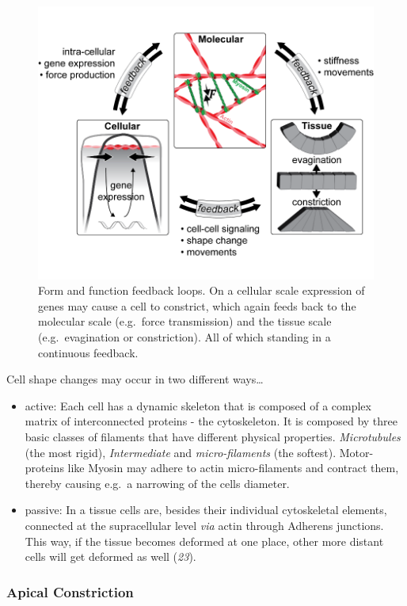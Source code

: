 \documentclass[11pt,singlespacinge,twoside]{reedthesis} %
\providecommand{\tightlist}{%
  \setlength{\itemsep}{0pt}\setlength{\parskip}{0pt}}
\theoremstyle{definition}
\theoremstyle{definition}
\theoremstyle{definition}
\theoremstyle{remark}
\begin{document}
\begin{figure}[h]

{\centering \includegraphics[width=0.85\linewidth,]{figures/intro/feedback} 

}

\caption[Form and function feedback loops]{Form and function feedback loops. On a cellular scale expression of genes may cause a cell to constrict, which again feeds back to the molecular scale (e.g.~force transmission) and the tissue scale (e.g.~evagination or constriction). All of which standing in a continuous feedback.}\label{fig:feedb}
\end{figure}
Cell shape changes may occur in two different ways\ldots{}
\begin{itemize}
\tightlist
\item
  active: Each cell has a dynamic skeleton that is composed of a complex matrix of interconnected proteins - the cytoskeleton. It is composed by three basic classes of filaments that have different physical properties. \emph{Microtubules} (the most rigid), \emph{Intermediate} and \emph{micro-filaments} (the softest). Motor-proteins like Myosin may adhere to actin micro-filaments and contract them, thereby causing e.g.~a narrowing of the cells diameter.
\item
  passive: In a tissue cells are, besides their individual cytoskeletal elements, connected at the supracellular level \emph{via} actin through Adherens junctions. This way, if the tissue becomes deformed at one place, other more distant cells will get deformed as well (\emph{23}).
\end{itemize}
\hypertarget{apical-constriction}{%
\subsubsection{Apical Constriction}\label{apical-constriction}}
\end{document}
